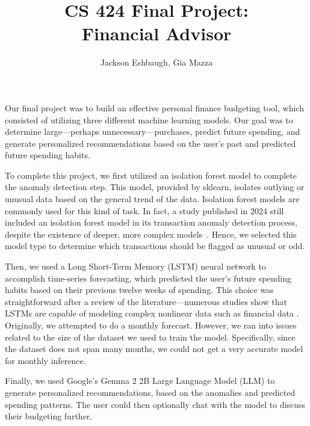 \documentclass{article}[12pt]
\title{CS 424 Final Project: \\ Financial Advisor}
\author{
  Jackson Eshbaugh, Gia Mazza
}
\begin{document}
\maketitle

Our final project was to build an effective personal finance budgeting tool, which consisted of utilizing three different machine learning models. Our goal was to determine large—perhaps unnecessary—purchases, predict future spending, and generate personalized recommendations based on the user’s past and predicted future spending habits.

To complete this project, we first utilized an isolation forest model to complete the anomaly detection step. This model, provided by sklearn, isolates outlying or unusual data based on the general trend of the data. Isolation forest models are commonly used for this kind of task. In fact, a study published in 2024 still included an isolation forest model in its transaction anomaly detection process, despite the existence of deeper, more complex models~\cite{KumarBansal2024BoostingAD}. Hence, we  selected this model type to determine which transactions should be flagged as unusual or odd. 

Then, we used a Long Short-Term Memory (LSTM) neural network to accomplish time-series forecasting, which predicted the user’s future spending habits based on their previous twelve weeks of spending. This choice was straightforward after a review of the literature—numerous studies show that LSTMs are capable of modeling complex nonlinear data such as financial data \cite{Yan2017FinancialTS, Kumar2024PERSONALFM}. Originally, we attempted to do a monthly forecast. However, we ran into issues related to the size of the dataset we used to train the model. Specifically, since the dataset does not span many months, we could not get a very accurate model for monthly inference.

Finally, we used Google’s Gemma 2 2B Large Language Model (LLM) \cite{Mesnard2024GemmaOM} to generate personalized recommendations, based on the anomalies and predicted spending patterns. The user could then optionally chat with the model to discuss their budgeting further.
\end{document}
